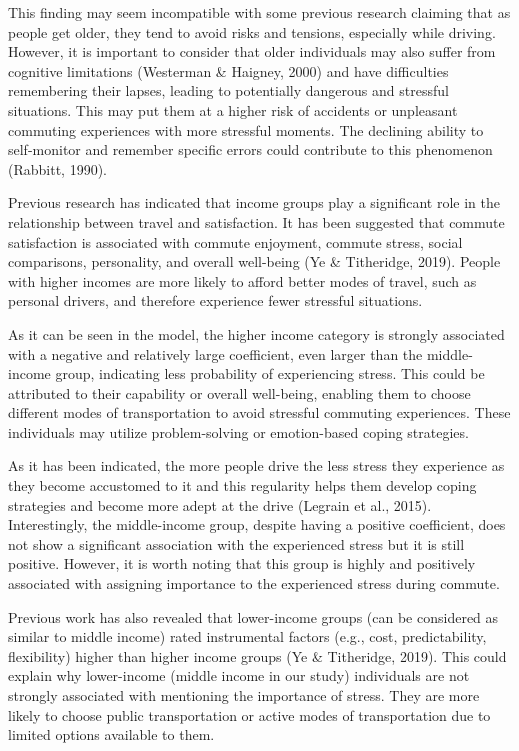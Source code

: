 \documentclass[
11pt, %
oneside, %
english, %
singlespacing, %
]{macthesis} %
\begin{document}
This finding may seem incompatible with some previous research claiming that as people get older, they tend to avoid risks and tensions, especially while driving. However, it is important to consider that older individuals may also suffer from cognitive limitations (Westerman \& Haigney, 2000) and have difficulties remembering their lapses, leading to potentially dangerous and stressful situations. This may put them at a higher risk of accidents or unpleasant commuting experiences with more stressful moments. The declining ability to self-monitor and remember specific errors could contribute to this phenomenon (Rabbitt, 1990).

Previous research has indicated that income groups play a significant role in the relationship between travel and satisfaction. It has been suggested that commute satisfaction is associated with commute enjoyment, commute stress, social comparisons, personality, and overall well-being (Ye \& Titheridge, 2019). People with higher incomes are more likely to afford better modes of travel, such as personal drivers, and therefore experience fewer stressful situations.

As it can be seen in the model, the higher income category is strongly associated with a negative and relatively large coefficient, even larger than the middle-income group, indicating less probability of experiencing stress. This could be attributed to their capability or overall well-being, enabling them to choose different modes of transportation to avoid stressful commuting experiences. These individuals may utilize problem-solving or emotion-based coping strategies.

As it has been indicated, the more people drive the less stress they experience as they become accustomed to it and this regularity helps them develop coping strategies and become more adept at the drive (Legrain et al., 2015). Interestingly, the middle-income group, despite having a positive coefficient, does not show a significant association with the experienced stress but it is still positive. However, it is worth noting that this group is highly and positively associated with assigning importance to the experienced stress during commute.

Previous work has also revealed that lower-income groups (can be considered as similar to middle income) rated instrumental factors (e.g., cost, predictability, flexibility) higher than higher income groups (Ye \& Titheridge, 2019). This could explain why lower-income (middle income in our study) individuals are not strongly associated with mentioning the importance of stress. They are more likely to choose public transportation or active modes of transportation due to limited options available to them.
\end{document}
